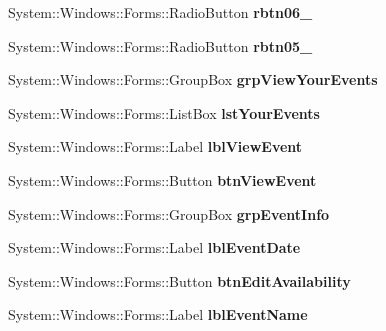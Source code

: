 \begin{DoxyCompactItemize}
System\+::\+Windows\+::\+Forms\+::\+Radio\+Button {\bfseries rbtn06\+\_}
\item 
\mbox{\label{class_project1_1_1_my_form_a9ec0ba71600029649d5c3def1b056921}} 
System\+::\+Windows\+::\+Forms\+::\+Radio\+Button {\bfseries rbtn05\+\_}
\item 
\mbox{\label{class_project1_1_1_my_form_afbea6fec17612187671ec8b39b2ec1ce}} 
System\+::\+Windows\+::\+Forms\+::\+Group\+Box {\bfseries grp\+View\+Your\+Events}
\item 
\mbox{\label{class_project1_1_1_my_form_ab5aae47805d0ced45aac4692d8dc00cb}} 
System\+::\+Windows\+::\+Forms\+::\+List\+Box {\bfseries lst\+Your\+Events}
\item 
\mbox{\label{class_project1_1_1_my_form_acf21282919a3105d593674a93e4fc8d2}} 
System\+::\+Windows\+::\+Forms\+::\+Label {\bfseries lbl\+View\+Event}
\item 
\mbox{\label{class_project1_1_1_my_form_aaa853cd5a4b50969b442ae6c48f888fb}} 
System\+::\+Windows\+::\+Forms\+::\+Button {\bfseries btn\+View\+Event}
\item 
\mbox{\label{class_project1_1_1_my_form_a89a9e8c5670967f4ce529b530fddeea5}} 
System\+::\+Windows\+::\+Forms\+::\+Group\+Box {\bfseries grp\+Event\+Info}
\item 
\mbox{\label{class_project1_1_1_my_form_a12261aae1eb0fff7a922803164dfeebe}} 
System\+::\+Windows\+::\+Forms\+::\+Label {\bfseries lbl\+Event\+Date}
\item 
\mbox{\label{class_project1_1_1_my_form_ab1680c7679af1339227d6e735cd79998}} 
System\+::\+Windows\+::\+Forms\+::\+Button {\bfseries btn\+Edit\+Availability}
\item 
\mbox{\label{class_project1_1_1_my_form_a38c39a9b571ce4cec73d21c1f4b9f662}} 
System\+::\+Windows\+::\+Forms\+::\+Label {\bfseries lbl\+Event\+Name}
\item 
\mbox{\label{class_project1_1_1_my_form_a18d3cf2391c67805bb5136cc6cb893c7}} 

\end{DoxyCompactItemize}
